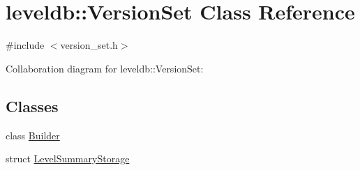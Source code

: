 \hypertarget{classleveldb_1_1_version_set}{\section{leveldb\-:\-:Version\-Set Class Reference}
\label{classleveldb_1_1_version_set}
}


{\ttfamily \#include $<$version\-\_\-set.\-h$>$}



Collaboration diagram for leveldb\-:\-:Version\-Set\-:
\subsection*{Classes}
\begin{DoxyCompactItemize}
\item 
class \hyperlink{classleveldb_1_1_version_set_1_1_builder}{Builder}
\item 
struct \hyperlink{structleveldb_1_1_version_set_1_1_level_summary_storage}{Level\-Summary\-Storage}
\end{DoxyCompactItemize}
